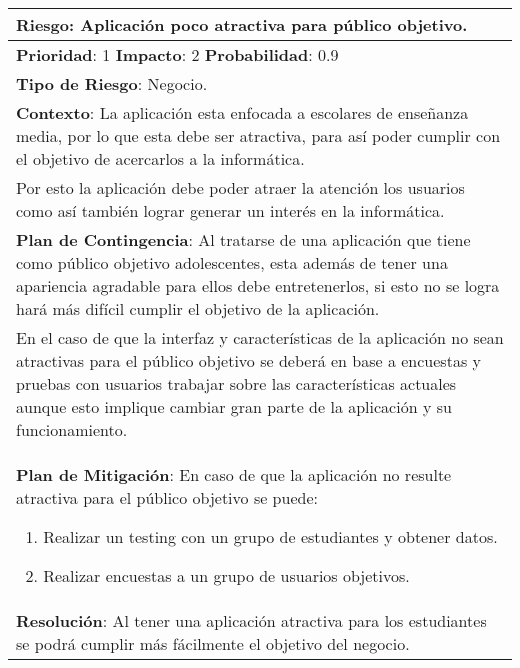 \begin{table}[H]
  \centering
  \begin{tabular}{|p{15cm}|}\hline
    {\bf Riesgo}: Aplicación poco atractiva para público objetivo.\\\hline
    {\bf Prioridad}: 1  {\bf Impacto}: 2  {\bf Probabilidad}: 0.9\\\hline
    {\bf Tipo de Riesgo}: Negocio.\\\hline
    {\bf Contexto}: La aplicación esta enfocada a escolares de enseñanza media, por lo que esta debe ser atractiva, para así poder cumplir con el objetivo de acercarlos a la informática.\\Por esto la aplicación debe poder atraer la atención los usuarios como así también lograr generar un interés en la informática.\\\hline
    {\bf Plan de Contingencia}: Al tratarse de una aplicación que tiene como público objetivo adolescentes, esta además de tener una apariencia agradable para ellos debe entretenerlos, si esto no se logra hará más difícil cumplir el objetivo de la aplicación.\\En el  caso de que la interfaz y características de la aplicación no sean atractivas para el público objetivo se deberá en base a encuestas y pruebas con usuarios trabajar sobre las características actuales aunque esto implique cambiar gran parte de la aplicación y su funcionamiento.\\\hline
    {\bf Plan de Mitigación}: En caso de que la aplicación no resulte atractiva para el público objetivo se puede:\begin{enumerate}\item Realizar un testing con un grupo de estudiantes y obtener datos.\item Realizar encuestas a un grupo de usuarios objetivos.\end{enumerate}\\\hline
    {\bf Resolución}: Al tener una aplicación atractiva para los estudiantes se podrá cumplir más fácilmente el objetivo del negocio.
  \end{tabular}\\\hline
  \label{table:R9}
\end{table}


